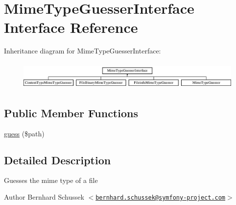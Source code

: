 \hypertarget{interface_symfony_1_1_component_1_1_http_foundation_1_1_file_1_1_mime_type_1_1_mime_type_guesser_interface}{
\section{\-Mime\-Type\-Guesser\-Interface \-Interface \-Reference}
\label{interface_symfony_1_1_component_1_1_http_foundation_1_1_file_1_1_mime_type_1_1_mime_type_guesser_interface}
}
\-Inheritance diagram for \-Mime\-Type\-Guesser\-Interface\-:\begin{figure}[H]
\begin{center}
\leavevmode
\includegraphics[height=1.428571cm]{interface_symfony_1_1_component_1_1_http_foundation_1_1_file_1_1_mime_type_1_1_mime_type_guesser_interface}
\end{center}
\end{figure}
\subsection*{\-Public \-Member \-Functions}
\begin{DoxyCompactItemize}
\item 
\hyperlink{interface_symfony_1_1_component_1_1_http_foundation_1_1_file_1_1_mime_type_1_1_mime_type_guesser_interface_af42fcbb87eebfa7fa5e31c9c42af0c1a}{guess} (\$path)
\end{DoxyCompactItemize}


\subsection{\-Detailed \-Description}
\-Guesses the mime type of a file

\begin{DoxyAuthor}{\-Author}
\-Bernhard \-Schussek $<$\href{mailto:bernhard.schussek@symfony-project.com}{\tt bernhard.\-schussek@symfony-\/project.\-com}$>$ 
\end{DoxyAuthor}


